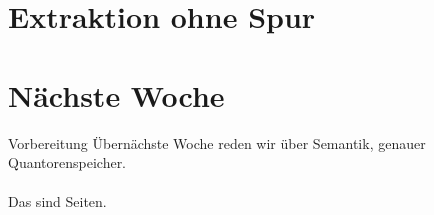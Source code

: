\section{Extraktion ohne Spur}

\section{Nächste Woche}

\begin{frame}
  {Vorbereitung}
  \onslide<+->
  \onslide<+->
  \centering 
  \large
  \alert{Übernächste} Woche reden wir über Semantik, genauer Quantorenspeicher.\\
  \onslide<+->
  \Zeile
  \\
  \onslide<+->
  \Viertelzeile
  Das sind  Seiten.\\
\end{frame}
